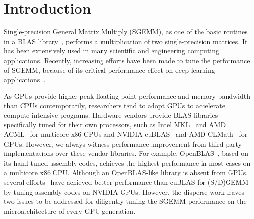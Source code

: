 \section{Introduction}
Single-precision General Matrix Multiply (SGEMM), as one 
of the basic routines in a BLAS library~\cite{blas,intel2007intel,amd2014}, performs a multiplication of two single-precision matrices. 
It has been extensively used in many scientific and engineering 
computing applications. 
Recently, increasing efforts have been made to tune the performance of SGEMM, because of its critical performance effect on deep learning applications~\cite{chetlur2014cudnn,nervana_sgemm_wiki}.

As GPUs provide higher peak floating-point performance and memory bandwidth than CPUs contemporarily, researchers tend to adopt GPUs to accelerate compute-intensive programs. 
Hardware vendors provide BLAS libraries specifically tuned for their own processors, such as Intel MKL~\cite{intel2007intel} and AMD ACML~\cite{amd2014} for multicore x86 CPUs and NVIDIA cuBLAS~\cite{intel2007intel} and AMD CLMath~\cite{clmath} for GPUs. 
However, we always witness performance improvement from third-party implementations over these vendor libraries. 
For example, OpenBLAS~\cite{xianyi2012openblas}, based on its hand-tuned assembly codes, achieves the highest performance in most cases on a multicore x86 CPU.
Although an OpenBLAS-like library is absent from GPUs, several %
efforts~\cite{tan,lai,nervana_sgemm_wiki,
chien, volkov} have achieved better performance than cuBLAS for (S/D)GEMM by tuning assembly codes on NVIDIA GPUs. 
However, %
the disperse work leaves two issues to be addressed for diligently tuning the SGEMM performance on the microarchitecture of every GPU generation.


